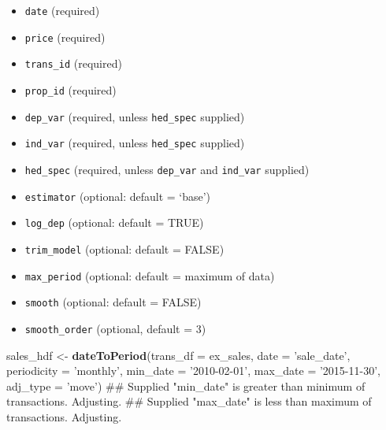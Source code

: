 \documentclass[]{article}
\newenvironment{Shaded}{\begin{snugshade}}{\end{snugshade}}
\newcommand{\KeywordTok}[1]{\textcolor[rgb]{0.13,0.29,0.53}{\textbf{#1}}}
\newcommand{\DataTypeTok}[1]{\textcolor[rgb]{0.13,0.29,0.53}{#1}}
\newcommand{\StringTok}[1]{\textcolor[rgb]{0.31,0.60,0.02}{#1}}
\newcommand{\NormalTok}[1]{#1}
\providecommand{\tightlist}{%
  \setlength{\itemsep}{0pt}\setlength{\parskip}{0pt}}
\begin{document}
\begin{itemize}
\tightlist
\item
  \texttt{date} (required)
\item
  \texttt{price} (required)
\item
  \texttt{trans\_id} (required)
\item
  \texttt{prop\_id} (required)
\item
  \texttt{dep\_var} (required, unless \texttt{hed\_spec} supplied)
\item
  \texttt{ind\_var} (required, unless \texttt{hed\_spec} supplied)
\item
  \texttt{hed\_spec} (required, unless \texttt{dep\_var} and
  \texttt{ind\_var} supplied)
\item
  \texttt{estimator} (optional: default = `base')
\item
  \texttt{log\_dep} (optional: default = TRUE)
\item
  \texttt{trim\_model} (optional: default = FALSE)
\item
  \texttt{max\_period} (optional: default = maximum of data)
\item
  \texttt{smooth} (optional: default = FALSE)
\item
  \texttt{smooth\_order} (optional, default = 3)
\end{itemize}

\begin{Shaded}
\begin{Highlighting}[]
\NormalTok{  sales_hdf <-}\StringTok{ }\KeywordTok{dateToPeriod}\NormalTok{(}\DataTypeTok{trans_df =}\NormalTok{ ex_sales,}
                           \DataTypeTok{date =} \StringTok{'sale_date'}\NormalTok{,}
                           \DataTypeTok{periodicity =} \StringTok{'monthly'}\NormalTok{,}
                           \DataTypeTok{min_date =} \StringTok{'2010-02-01'}\NormalTok{,}
                           \DataTypeTok{max_date =} \StringTok{'2015-11-30'}\NormalTok{,}
                           \DataTypeTok{adj_type =} \StringTok{'move'}\NormalTok{)}
\NormalTok{## Supplied "min_date" is greater than minimum of transactions. Adjusting.}
\NormalTok{## Supplied "max_date" is less than maximum of transactions. Adjusting.}
\end{Highlighting}
\end{Shaded}
\end{document}
